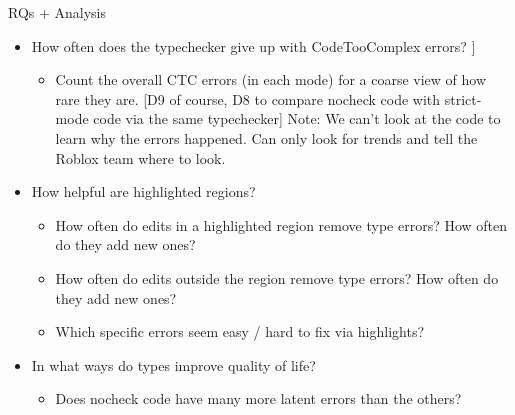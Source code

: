\documentclass[
  acmsmall,
  review,
]{acmart}
\begin{document}
RQs + Analysis

\begin{itemize}
  \item How often does the typechecker give up with CodeTooComplex errors?
  \subitem [[ For context: the type system is designed to give useful feedback
    to all sorts of code, whether strict-typed, nonstrict-typed, or nocheck.
    But it has an escape hatch: CTC. Hope it's rarely needed. ]]
    \begin{itemize}
      \item Count the overall CTC errors (in each mode) for a coarse view of
        how rare they are. [D9 of course, D8 to compare nocheck code with
        strict-mode code via the same typechecker]
      \subitem Note: We can't look at the code to learn why the errors
        happened. Can only look for trends and tell the Roblox team where to
        look.
    \end{itemize}
  \item How helpful are highlighted regions?
    \begin{itemize}
      \item How often do edits in a highlighted region remove type errors? How
        often do they add new ones?
      \item How often do edits outside the region remove type errors? How often do they add new ones?
      \item Which specific errors seem easy / hard to fix via highlights?
      \subitem [D6 removed by edit => easy; D6 survive edit => hard]
    \end{itemize}
  \item In what ways do types improve quality of life?
  \begin{itemize}
    \item Does nocheck code have many more latent errors than the others?
  \end{itemize}
\end{itemize}
\end{document}
